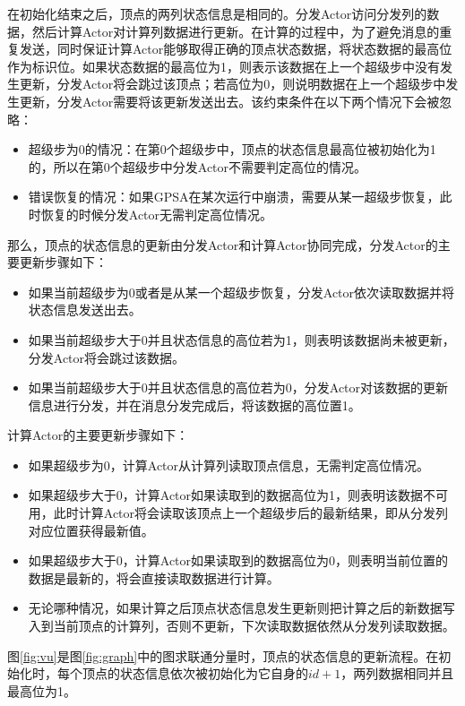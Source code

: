 在初始化结束之后，顶点的两列状态信息是相同的。分发Actor访问分发列的数据，然后计算Actor对计算列数据进行更新。在计算的过程中，为了避免消息的重复发送，同时保证计算Actor能够取得正确的顶点状态数据，将状态数据的最高位作为标识位。如果状态数据的最高位为1，则表示该数据在上一个超级步中没有发生更新，分发Actor将会跳过该顶点；若高位为0，则说明数据在上一个超级步中发生更新，分发Actor需要将该更新发送出去。该约束条件在以下两个情况下会被忽略：
\begin{itemize}
\item 超级步为0的情况：在第0个超级步中，顶点的状态信息最高位被初始化为1的，所以在第0个超级步中分发Actor不需要判定高位的情况。
\item 错误恢复的情况：如果GPSA在某次运行中崩溃，需要从某一超级步恢复，此时恢复的时候分发Actor无需判定高位情况。
\end{itemize}

那么，顶点的状态信息的更新由分发Actor和计算Actor协同完成，分发Actor的主要更新步骤如下：

\begin{itemize}
\item 如果当前超级步为0或者是从某一个超级步恢复，分发Actor依次读取数据并将状态信息发送出去。
\item 如果当前超级步大于0并且状态信息的高位若为1，则表明该数据尚未被更新，分发Actor将会跳过该数据。
\item 如果当前超级步大于0并且状态信息的高位若为0，分发Actor对该数据的更新信息进行分发，并在消息分发完成后，将该数据的高位置1。
\end{itemize}

计算Actor的主要更新步骤如下：

\begin{itemize}
\item 如果超级步为0，计算Actor从计算列读取顶点信息，无需判定高位情况。
\item 如果超级步大于0，计算Actor如果读取到的数据高位为1，则表明该数据不可用，此时计算Actor将会读取该顶点上一个超级步后的最新结果，即从分发列对应位置获得最新值。
\item 如果超级步大于0，计算Actor如果读取到的数据高位为0，则表明当前位置的数据是最新的，将会直接读取数据进行计算。
\item 无论哪种情况，如果计算之后顶点状态信息发生更新则把计算之后的新数据写入到当前顶点的计算列，否则不更新，下次读取数据依然从分发列读取数据。
\end{itemize}

图\ref{fig:vu}是图\ref{fig:graph}中的图求联通分量时，顶点的状态信息的更新流程。在初始化时，每个顶点的状态信息依次被初始化为它自身的$id+1$，两列数据相同并且最高位为1。

